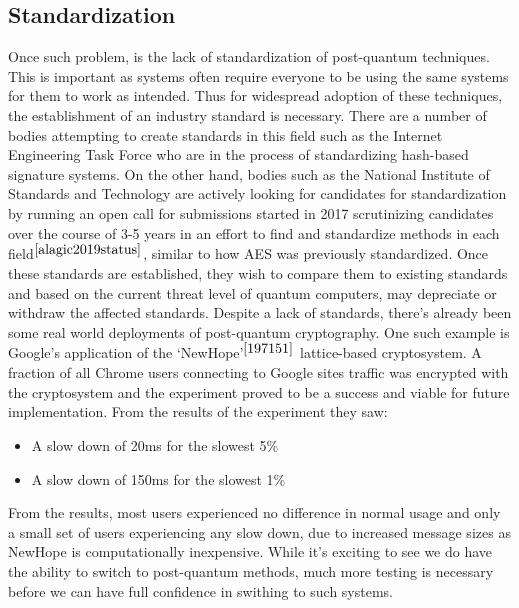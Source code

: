 \documentclass[10pt,a4paper]{IEEEtran}
\begin{document}
\subsection{Standardization}

Once such problem, is the lack of standardization of post-quantum techniques. This is important as systems often require everyone to be using the same systems for them to work as intended. Thus for widespread adoption of these techniques, the establishment of  an industry standard is necessary. There are a number of bodies attempting to create standards in this field such as the Internet Engineering Task Force who are in the process of standardizing hash-based signature systems. On the other hand, bodies such as the National Institute of Standards and Technology are actively looking for candidates for standardization by running an open call for submissions started in 2017 scrutinizing candidates over the course of 3-5 years in an effort to find and standardize methods in each field\(^{\cite{alagic2019status}}\), similar to how AES was previously standardized. Once these standards are established, they wish to compare them to existing standards and based on the current threat level of quantum computers, may depreciate or withdraw the affected standards. 
\newline
Despite a lack of standards, there's already been some real world deployments of post-quantum cryptography. One such example is Google's application of the `NewHope'\(^{\cite{197151}}\) lattice-based cryptosystem. A fraction of all Chrome users connecting to Google sites traffic was encrypted with the cryptosystem and the experiment proved to be a success and viable for future implementation. From the results of the experiment they saw: 
\begin{itemize}
\item A slow down of 20ms for the slowest 5\% 
\item A slow down of 150ms for the slowest 1\%
\end{itemize}
From the results, most users experienced no difference in normal usage and only a small set of users experiencing any slow down, due to increased message sizes as NewHope is computationally inexpensive.
\newline
While it's exciting to see we do have the ability to switch to post-quantum methods, much more testing is necessary before we can have full confidence in swithing to such systems. 
\end{document}
